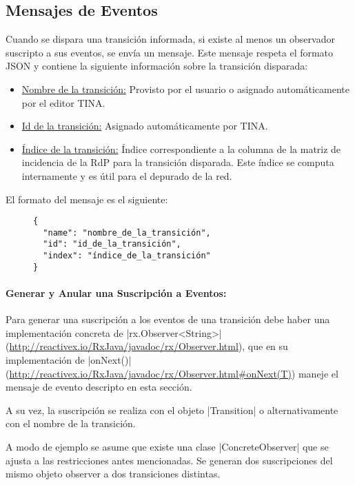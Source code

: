 \subsection{Mensajes de Eventos}
\label{mensaje_eventos}

Cuando se dispara una transición informada, si existe al menos un observador
suscripto a sus eventos, se envía un mensaje. Este mensaje respeta el formato
JSON y contiene la siguiente información sobre la transición disparada:

\begin{itemize}
    \item \underline{Nombre de la transición:} Provisto por el usuario o
    asignado automáticamente por el editor TINA.
    \item \underline{Id de la transición:} Asignado automáticamente por TINA.
    \item \underline{Índice de la transición:} Índice correspondiente a la
    columna de la matriz de incidencia de la RdP para la transición disparada.
    Este índice se computa internamente y es útil para el depurado de la red.
\end{itemize}

El formato del mensaje es el siguiente:

\begin{figure}[H]
\centering
\begin{verbatim}
{
  "name": "nombre_de_la_transición",
  "id": "id_de_la_transición",
  "index": "índice_de_la_transición"
}
\end{verbatim}
\end{figure}

\paragraph{Generar y Anular una Suscripción a Eventos:}
Para generar una suscripción a los eventos de una transición debe haber una
implementación concreta de |rx.Observer<String>|
(\url{http://reactivex.io/RxJava/javadoc/rx/Observer.html}), que en su
implementación de |onNext()| 
(\url{http://reactivex.io/RxJava/javadoc/rx/Observer.html#onNext(T)})
maneje el mensaje de evento descripto en esta sección.

A su vez, la suscripción se realiza con el objeto |Transition| o
alternativamente con el nombre de la transición.

A modo de ejemplo se asume que existe una clase |ConcreteObserver|
que se ajusta a las restricciones antes mencionadas. Se generan dos
suscripciones del mismo objeto observer a dos transiciones distintas.

